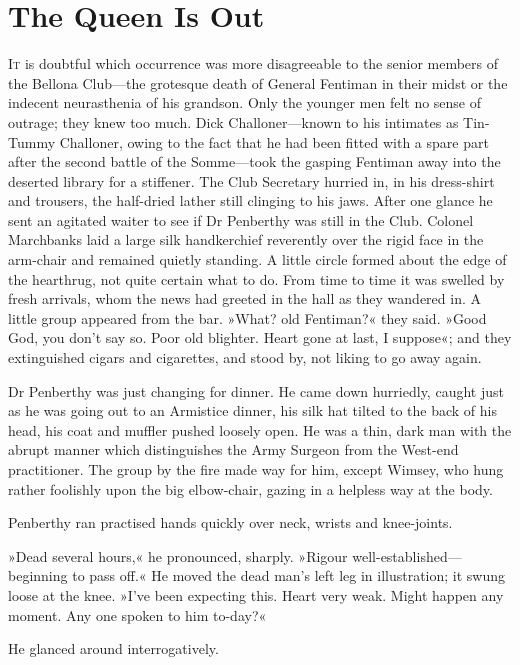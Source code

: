 \chapter{The Queen Is Out}
\lettrine[lines=4]{I}{t} is doubtful which occurrence was more disagreeable to the senior members of the Bellona Club\allowbreak---\allowbreak the grotesque death of General Fentiman in their midst or the indecent neurasthenia of his grandson. Only the younger men felt no sense of outrage; they knew too much. Dick Challoner\allowbreak---\allowbreak known to his intimates as Tin-Tummy Challoner, owing to the fact that he had been fitted with a spare part after the second battle of the Somme\allowbreak---\allowbreak took the gasping Fentiman away into the deserted library for a stiffener. The Club Secretary hurried in, in his dress-shirt and trousers, the half-dried lather still clinging to his jaws. After one glance he sent an agitated waiter to see if Dr Penberthy was still in the Club. Colonel Marchbanks laid a large silk handkerchief reverently over the rigid face in the arm-chair and remained quietly standing. A little circle formed about the edge of the hearthrug, not quite certain what to do. From time to time it was swelled by fresh arrivals, whom the news had greeted in the hall as they wandered in. A little group appeared from the bar. »What? old Fentiman?« they said. »Good God, you don't say so. Poor old blighter. Heart gone at last, I suppose«; and they extinguished cigars and cigarettes, and stood by, not liking to go away again.

Dr Penberthy was just changing for dinner. He came down hurriedly, caught just as he was going out to an Armistice dinner, his silk hat tilted to the back of his head, his coat and muffler pushed loosely open. He was a thin, dark man with the abrupt manner which distinguishes the Army Surgeon from the West-end practitioner. The group by the fire made way for him, except Wimsey, who hung rather foolishly upon the big elbow-chair, gazing in a helpless way at the body.

Penberthy ran practised hands quickly over neck, wrists and knee-joints.

»Dead several hours,« he pronounced, sharply. »Rigour well-established\allowbreak---\allowbreak beginning to pass off.« He moved the dead man's left leg in illustration; it swung loose at the knee. »I've been expecting this. Heart very weak. Might happen any moment. Any one spoken to him to-day?«

He glanced around interrogatively.

